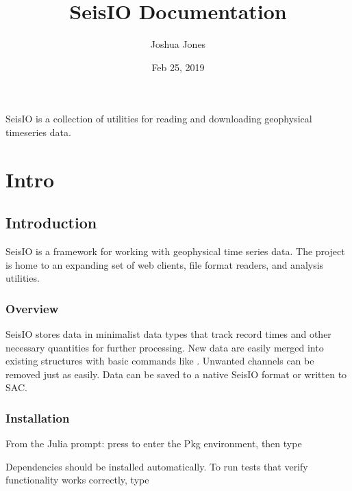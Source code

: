 \documentclass[letterpaper,11pt,english]{sphinxmanual}
\title{SeisIO Documentation}
\date{Feb 25, 2019}
\author{Joshua Jones}
\begin{document}
\pagestyle{empty}
\sphinxmaketitle
\pagestyle{plain}
\sphinxtableofcontents
\pagestyle{normal}
\label{\detokenize{index::doc}}


SeisIO is a collection of utilities for reading and downloading geophysical timeseries data.


\chapter{Intro}
\label{\detokenize{index:intro}}

\section{Introduction}
\label{\detokenize{src/intro:introduction}}\label{\detokenize{src/intro::doc}}
SeisIO is a framework for working with geophysical time series data. The project is home to an expanding set of web clients, file format readers, and analysis utilities.


\subsection{Overview}
\label{\detokenize{src/intro:overview}}
SeisIO stores data in minimalist data types that track record times and other necessary quantities for further processing. New data are easily merged into existing structures with basic commands like \sphinxcode{\sphinxupquote{+}}. Unwanted channels can be removed just as easily. Data can be saved to a native SeisIO format or written to SAC.


\subsection{Installation}
\label{\detokenize{src/intro:installation}}
From the Julia prompt: press \sphinxcode{\sphinxupquote{{]}}} to enter the Pkg environment, then type

\begin{sphinxVerbatim}[commandchars=\\\{\}]
   
\end{sphinxVerbatim}

Dependencies should be installed automatically. To run tests that verify functionality works correctly, type
\end{document}

